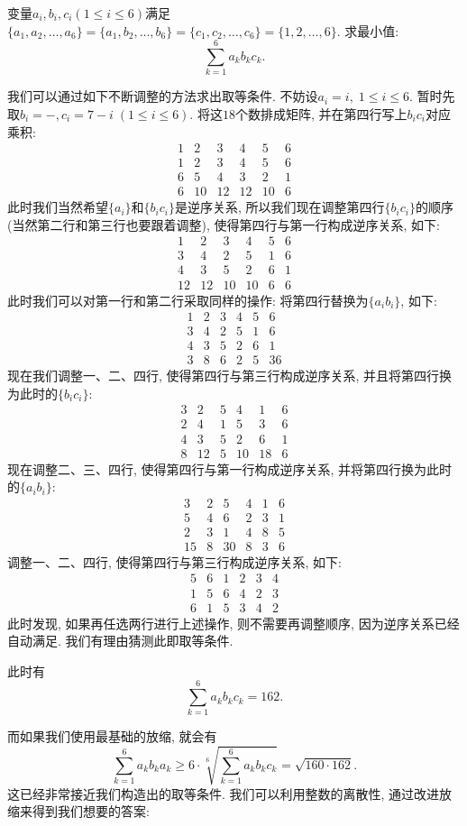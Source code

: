 \documentclass[lang=cn,12pt,thmcnt=section]{elegantbook}
\begin{document}
\begin{example}
变量$a_i,b_i,c_i(1\le i\le 6)$满足$\{a_{1},a_{2},\ldots,a_{6}\}=\{a_{1},b_{2},\ldots,b_{6}\}=\{c_{1},c_{2},\ldots,c_{6}\}=\{1,2,\ldots,6\}$. 求最小值:
\[\sum_{k=1}^{6}a_{k}b_{k}c_{k}.\]
\end{example}

\begin{analysis}
我们可以通过如下不断调整的方法求出取等条件. 不妨设$a_i=i,\;1\le i\le 6$. 暂时先取$b_i=-,c_i=7-i\;(1\le i\le 6)$. 将这$18$个数排成矩阵, 并在第四行写上$b_ic_i$对应乘积:
\[\begin{matrix}1&2&3&4&5&6\\1&2&3&4&5&6\\6&5&4&3&2&1\\6&10&12&12&10&6\end{matrix}\]
此时我们当然希望$\{a_i\}$和$\{b_ic_i\}$是逆序关系, 所以我们现在调整第四行$\{b_ic_i\}$的顺序(当然第二行和第三行也要跟着调整), 使得第四行与第一行构成逆序关系, 如下:
\[\begin{matrix}1&2&3&4&5&6\\3&4&2&5&1&6\\4&3&5&2&6&1\\12&12&10&10&6&6\end{matrix}\]
此时我们可以对第一行和第二行采取同样的操作: 将第四行替换为$\{a_ib_i\}$, 如下:
\[\begin{matrix}1&2&3&4&5&6\\3&4&2&5&1&6\\4&3&5&2&6&1\\3&8&6&2&5&36\end{matrix}\]
现在我们调整一、二、四行, 使得第四行与第三行构成逆序关系, 并且将第四行换为此时的$\{b_ic_i\}$:
\[\begin{array}{cccccc}3&2&5&4&1&6\\2&4&1&5&3&6\\4&3&5&2&6&1\\8&12&5&10&18&6\end{array}\]
现在调整二、三、四行, 使得第四行与第一行构成逆序关系, 并将第四行换为此时的$\{a_ib_i\}$:
\[\begin{matrix}3&2&5&4&1&6\\5&4&6&2&3&1\\2&3&1&4&8&5\\15&8&30&8&3&6\end{matrix}\]
调整一、二、四行, 使得第四行与第三行构成逆序关系, 如下:
\[\begin{array}{cccccc}5&6&1&2&3&4\\1&5&6&4&2&3\\6&1&5&3&4&2\end{array}\]
此时发现, 如果再任选两行进行上述操作, 则不需要再调整顺序, 因为逆序关系已经自动满足. 我们有理由猜测此即取等条件.\par
此时有
\[\sum_{k=1}^{6}a_{k}b_{k}c_{k}=162.\]\par
而如果我们使用最基础的放缩, 就会有
\[\sum_{k=1}^{6}a_{k}b_{k}a_{k}\geq6\cdot\sqrt[6]{\sum_{k=1}^{6}a_{k}b_{k}c_{k}}=\sqrt{160\cdot162}.\]
这已经非常接近我们构造出的取等条件. 我们可以利用整数的离散性, 通过{\heiti 改进放缩}来得到我们想要的答案:
\end{analysis}
\end{document}
